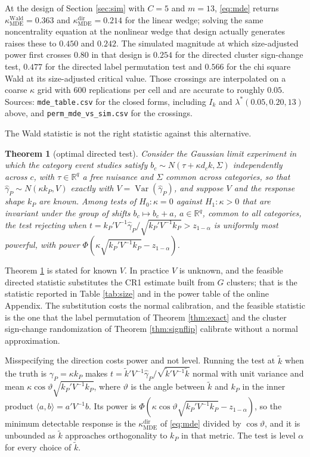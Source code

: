 \documentclass[12pt]{article}
\newtheorem{theorem}{Theorem}
\theoremstyle{definition}
\numberwithin{equation}{section}
\begin{document}
At the design of Section \ref{sec:sim} with $C = 5$ and $m = 13$,
\eqref{eq:mde} returns $\kappa^{\mathrm{Wald}}_{\mathrm{MDE}} = 0.363$ and
$\kappa^{\mathrm{dir}}_{\mathrm{MDE}} = 0.214$ for the linear wedge; solving the
same noncentrality equation at the nonlinear wedge that design actually
generates raises these to $0.450$ and $0.242$. The simulated magnitude at which
size-adjusted power first crosses $0.80$ in that design is $0.254$ for the
directed cluster sign-change test, $0.477$ for the directed label permutation
test and $0.566$ for the chi square Wald at its size-adjusted critical value.
Those crossings are interpolated on a coarse $\kappa$ grid with $600$
replications per cell and are accurate to roughly $0.05$. Sources:
\texttt{mde\_table.csv} for the closed forms, including $I_k$ and
$\lambda^*(0.05,0.20,13)$ above, and \texttt{perm\_mde\_vs\_sim.csv} for the
crossings.

The Wald statistic is not the right statistic against this alternative.

\begin{theorem}[optimal directed test]
\label{thm:umpi}
Consider the Gaussian limit experiment in which the category event studies
satisfy $b_c \sim N(\tau + \kappa d_c k, \Sigma)$ independently across $c$, with
$\tau \in \mathbb{R}^q$ a free nuisance and $\Sigma$ common across categories,
so that $\hat{\gamma}_P \sim N(\kappa k_P, V)$ exactly with $V =
\operatorname{Var}(\hat{\gamma}_P)$, and suppose $V$ and the response shape
$k_P$ are known. Among tests of $H_0: \kappa = 0$ against $H_1: \kappa > 0$ that
are invariant under the group of shifts $b_c \mapsto b_c + a$, $a \in
\mathbb{R}^q$, common to all categories, the test rejecting when $t = k_P'V^{-1}
\hat{\gamma}_P / \sqrt{k_P'V^{-1}k_P} > z_{1-\alpha}$ is uniformly most
powerful, with power $\Phi(\kappa \sqrt{k_P'V^{-1}k_P} - z_{1-\alpha})$.
\end{theorem}

Theorem \ref{thm:umpi} is stated for known $V$. In practice $V$ is unknown, and
the feasible directed statistic substitutes the CR1 estimate built from $G$
clusters; that is the statistic reported in Table \ref{tab:size}
and in the power table of the online Appendix. The substitution costs the normal calibration, and the feasible
statistic is the one that the label permutation of Theorem \ref{thm:exact} and
the cluster sign-change randomization of Theorem \ref{thm:signflip} calibrate
without a normal approximation.

Misspecifying the direction costs power and not level. Running the test at
$\tilde{k}$ when the truth is $\gamma_P = \kappa k_P$ makes $t =
\tilde{k}'V^{-1}\hat{\gamma}_P/\sqrt{\tilde{k}'V^{-1}\tilde{k}}$ normal with
unit variance and mean $\kappa \cos\vartheta \sqrt{k_P'V^{-1}k_P}$, where
$\vartheta$ is the angle between $\tilde{k}$ and $k_P$ in the inner product
$\langle a,b \rangle = a'V^{-1}b$. Its power is
$\Phi(\kappa\cos\vartheta\sqrt{k_P'V^{-1}k_P} - z_{1-\alpha})$, so the minimum
detectable response is the $\kappa^{\mathrm{dir}}_{\mathrm{MDE}}$ of
\eqref{eq:mde} divided by $\cos\vartheta$, and it is unbounded as $\tilde{k}$
approaches orthogonality to $k_P$ in that metric. The test is level $\alpha$ for
every choice of $\tilde{k}$.
\end{document}
